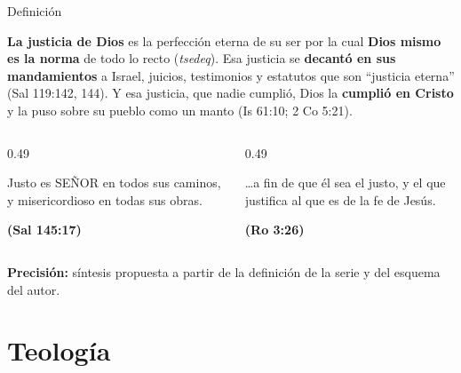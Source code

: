 \documentclass[hyperref={bookmarks=false},aspectratio=169]{beamer}
\newcommand{\SENOR}{S{\fontsize{0.78em}{1em}\selectfont EÑOR}}
\newcommand{\fuente}[1]{\par\hfill{\upshape\bfseries\footnotesize\textcolor{azul}{#1}}}
\newcommand{\precision}[1]{{\footnotesize\color{gris}\textbf{Precisión:} #1}}
\begin{document}
\begin{frame}{Definición}
\begin{tcolorbox}[colback=papiro,colframe=azul,boxrule=1pt,arc=3pt]
\small\textbf{La justicia de Dios} es la perfección eterna de su ser por la cual \textbf{Dios mismo es la norma} de todo lo recto (\emph{tsedeq}). Esa justicia se \textbf{decantó en sus mandamientos} a Israel, juicios, testimonios y estatutos que son ``justicia eterna'' (Sal 119:142, 144). Y esa justicia, que nadie cumplió, Dios la \textbf{cumplió en Cristo} y la puso sobre su pueblo como un manto (Is 61:10; 2 Co 5:21).
\end{tcolorbox}
\begin{columns}[t,onlytextwidth]
\begin{column}{0.49\textwidth}
\begin{cita}Justo es \SENOR{} en todos sus caminos, y misericordioso en todas sus obras.\fuente{(Sal 145:17)}\end{cita}
\end{column}
\begin{column}{0.49\textwidth}
\begin{cita}\ldots{}a fin de que él sea el justo, y el que justifica al que es de la fe de Jesús.\fuente{(Ro 3:26)}\end{cita}
\end{column}
\end{columns}
\precision{síntesis propuesta a partir de la definición de la serie y del esquema del autor.}
\end{frame}

\section{Teología}
\end{document}
